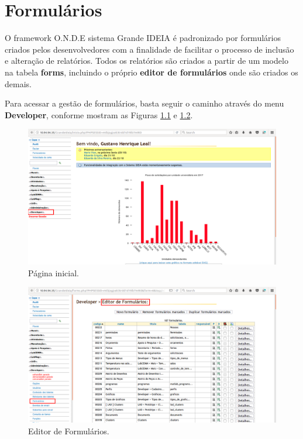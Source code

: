 \documentclass[9pt]{report}
\begin{document}
{      %
   \chapter{Formulários}
   
   O framework O.N.D.E sistema Grande IDEIA é padronizado por
   formulários criados pelos desenvolvedores com a finalidade de
   facilitar o processo de inclusão e alteração de relatórios. Todos
   os relatórios são criados a partir de um modelo na tabela
   \textbf{forms}, incluindo o próprio \textbf{editor de formulários}
   onde são criados os demais.
   
   Para acessar a gestão de formulários, basta seguir o caminho
   através do menu \textbf{Developer}, conforme mostram as Figuras
   \figurename{ \ref{fig:capa}} e \figurename{ \ref{fig:editorf}}.

    \begin{figure}[H]
      \includegraphics[width=\textwidth]{2_Formularios/1_Editor_de_formularios/1.png}
      \caption{Página inicial.}
      \label{fig:capa}
    \end{figure}

    \begin{figure}[H]
      \includegraphics[width=\textwidth]{2_Formularios/1_Editor_de_formularios/2.png}
      \caption{Editor de Formulários.}
      \label{fig:editorf}
    \end{figure}

}
\end{document}
